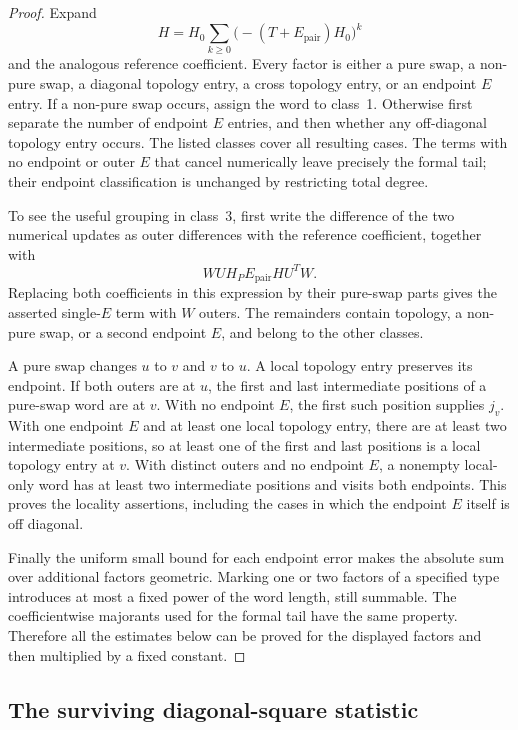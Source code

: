 \begin{proof}
Expand
\[
 H=H_0\sum_{k\geq0}
       \bigl(-(T+E_{\mathrm{pair}})H_0\bigr)^k
\]
and the analogous reference coefficient.  Every factor is either
a pure swap, a non-pure swap, a diagonal topology entry, a cross
topology entry, or an endpoint $E$ entry.  If a non-pure swap occurs,
assign the word to class~1.  Otherwise first separate the number of
endpoint $E$ entries, and then whether any off-diagonal topology
entry occurs.  The listed classes cover all resulting cases.
The terms with no endpoint or outer $E$ that cancel numerically
leave precisely the formal tail; their endpoint classification is
unchanged by restricting total degree.

To see the useful grouping in class~3, first write the difference
of the two numerical updates as outer differences with the reference
coefficient, together with
\[
 WU H_P E_{\mathrm{pair}} H U^TW.
\]
Replacing both coefficients in this expression by their pure-swap
parts gives the asserted single-$E$ term with $W$ outers.  The
remainders contain topology, a non-pure swap, or a second endpoint
$E$, and belong to the other classes.

A pure swap changes $u$ to $v$ and $v$ to $u$.  A local topology
entry preserves its endpoint.  If both outers are at $u$, the
first and last intermediate positions of a pure-swap word are at
$v$.  With no endpoint $E$, the first such position supplies $j_v$.
With one endpoint $E$ and at least one local topology entry, there
are at least two intermediate positions, so at least one of the
first and last positions is a local topology entry at $v$.  With
distinct outers and no endpoint $E$, a nonempty local-only word
has at least two intermediate positions and visits both endpoints.
This proves the locality assertions, including the cases in which
the endpoint $E$ itself is off diagonal.

Finally the uniform small bound for each endpoint error makes the
absolute sum over additional factors geometric.  Marking one or
two factors of a specified type introduces at most a fixed power
of the word length, still summable.  The coefficientwise majorants
used for the formal tail have the same property.  Therefore all
the estimates below can be proved for the displayed factors and
then multiplied by a fixed constant.
\end{proof}

\subsection{The surviving diagonal-square statistic}

